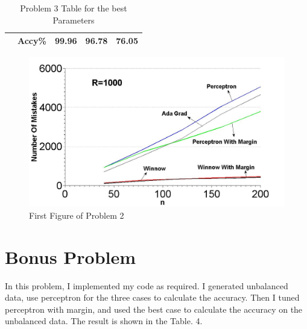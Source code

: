 \begin{center}
\begin{table}
\begin{tabular}{|p{4.3cm}<{\centering}|p{2.5cm}<{\centering}|p{2.7cm}<{\centering}|p{2.7cm}<{\centering}|p{2.7cm}<{\centering}|}
			\cline{2-5}
			& Accy\% &  99.96& 96.78& 76.05\\ \hline %
		\end{tabular}
			\caption{Problem 3 Table for the best Parameters}
	\end{table}
\end{center}

\begin{figure}[h!]
	\centering
	\includegraphics[width=1\textwidth]{Problem2Figure1}
	\caption{First Figure of Problem 2}
\end{figure}

\section{Bonus Problem}
In this problem, I implemented my code as required. I generated unbalanced data, use perceptron for the three cases to calculate the accuracy. Then I tuned perceptron with margin, and used the best case to calculate the accuracy on the unbalanced data. The result is shown in the Table. 4. 

